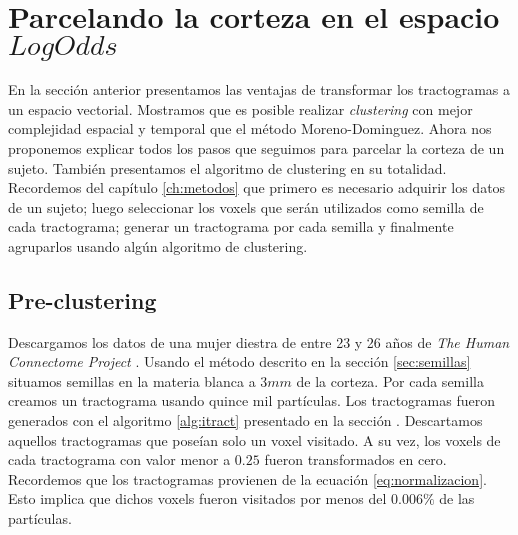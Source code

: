 \section{Parcelando la corteza en el espacio $LogOdds$} 
\label{ch:nuestro}

En la secci\'on anterior presentamos las ventajas de transformar los
tractogramas a un espacio vectorial. Mostramos que es posible realizar
\textit{clustering} con mejor complejidad espacial y temporal que el 
m\'etodo Moreno-Dominguez. Ahora nos proponemos explicar todos los pasos
que seguimos para parcelar la corteza de un sujeto. Tambi\'en presentamos
el algoritmo de clustering en su totalidad. Recordemos del cap\'itulo 
\ref{ch:metodos} que primero es necesario adquirir los datos de un sujeto;
luego seleccionar los voxels que ser\'an utilizados como semilla de cada
tractograma; generar un tractograma por cada semilla y finalmente
agruparlos usando alg\'un algoritmo de clustering. \\

\subsection{Pre-clustering}
\label{sec:preclustering}
Descargamos los datos de una mujer diestra de entre 23 y 26 a\~nos de 
\textit{The Human Connectome Project} \cite{VanEssen2012}. Usando el 
m\'etodo descrito en la secci\'on \ref{sec:semillas} situamos semillas en
la materia blanca a $3mm$ de la corteza. Por cada semilla creamos un
tractograma usando quince mil part\'iculas. Los tractogramas fueron 
generados con el algoritmo \ref{alg:itract} presentado en la secci\'on 
\label{sec:convergencia}. Descartamos aquellos tractogramas que pose\'ian
solo un voxel visitado. A su vez, los voxels de cada tractograma con valor
menor a $0.25$ fueron transformados en cero. Recordemos que los
tractogramas provienen de la ecuaci\'on \ref{eq:normalizacion}. Esto
implica que dichos voxels fueron visitados por menos del $0.006\%$ de las
part\'iculas. \\

\settowidth{}
\addtolength\mylen{\parindent}

